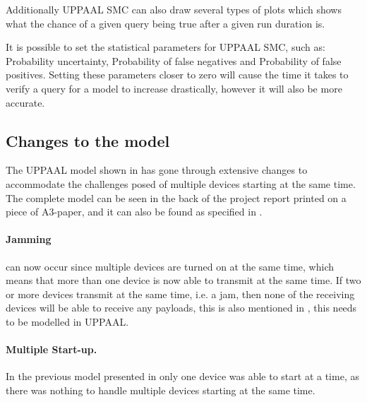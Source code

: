Additionally UPPAAL SMC can also draw several types of plots which shows what the chance of a given query being true after a given run duration is.

It is possible to set the statistical parameters for UPPAAL SMC, such as: Probability uncertainty, Probability of false negatives and Probability of false positives. 
Setting these parameters closer to zero will cause the time it takes to verify a query for a model to increase drastically, however it will also be more accurate. 


\subsection*{Changes to the model}

The UPPAAL model shown in  has gone through extensive changes to accommodate the challenges posed of multiple devices starting at the same time.
The complete model can be seen in the back of the project report printed on a piece of A3-paper, and it can also be found as specified in  .


\paragraph{Jamming} can now occur since multiple devices are turned on at the same time, which means that more than one device is now able to transmit at the same time.
If two or more devices transmit at the same time, i.e. a jam, then none of the receiving devices will be able to receive any payloads, this is also mentioned in , this needs to be modelled in UPPAAL. 

\paragraph{Multiple Start-up.}
In the previous model presented in  only one device was able to start at a time, as there was nothing to handle multiple devices starting at the same time.

